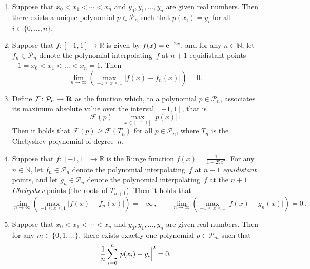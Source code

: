 \documentclass[a4paper]{article}
\begin{document}
\begin{enumerate}

    \item
        Suppose that $x_0 < x_1 < \dotsb < x_n$ and $y_0, y_1, \dotsc, y_n$ are given real numbers.
        Then there exists a unique polynomial $p \in \mathcal P_n$ such that $p(x_i) = y_i$ for all $i \in \{0, \dotsc, n\}$.

    \item
        Suppose that $f \colon [-1, 1] \to \mathbb R$ is given by $f(x) = \mathrm e^{-2x}$,
        and for any $n \in \mathbb N$,
        let $f_n \in \mathcal P_n$ denote the polynomial interpolating~$f$ at $n+1$ equidistant points $-1 = x_0 < x_1 < \dotsc < x_n = 1$.
        Then
        \[
            \lim_{n \to \infty} \left( \max_{-1 \leq x \leq 1} \bigl\lvert f(x) - f_n(x) \bigr\rvert \right) = 0.
        \]

    \item
        Define $\mathcal F \colon \mathcal P_n \to \mathbf R$ as the function which,
        to a polynomial $p \in \mathcal P_n$, associates its maximum absolute value over the interval $[-1, 1]$,
        that is
        \[
            \mathcal F(p) = \max_{x \in [-1, 1]} \left\lvert p(x) \right\rvert \, .
        \]
        Then it holds that $\mathcal F(p) \geq \mathcal F(T_n)$ for all $p \in \mathcal P_n$,
        where $T_n$ is the Chebyshev polynomial of degree~$n$.


    \item
        Suppose that $f \colon [-1, 1] \to \mathbb R$ is the Runge function $f(x) = \frac{1}{1 + 25 x^2}$.
        For any $n \in \mathbb N$,
        let $f_n \in \mathcal P_n$ denote the polynomial interpolating~$f$ at $n+1$ \emph{equidistant} points,
        and let $g_n \in \mathcal P_n$ denote the polynomial interpolating~$f$ at the $n+1$ \emph{Chebyshev} points (the roots of $T_{n+1}$).
        Then it holds that
        \[
            \lim_{n \to \infty} \left( \max_{-1 \leq x \leq 1} \bigl\lvert f(x) - f_n(x) \bigr\rvert \right) = +\infty \, ,
            \qquad
            \lim_{n \to \infty} \left( \max_{-1 \leq x \leq 1} \bigl\lvert f(x) - g_n(x) \bigr\rvert \right) = 0 \, .
        \]

    \item
        Suppose that $x_0 < x_1 < \dotsb < x_n$ and $y_0, y_1, \dotsc, y_n$ are given real numbers.
        Then for any $m \in \{0, 1, \dotsc\}$,
        there exists exactly one polynomial $p \in \mathcal P_m$ such that 
        \[
            \frac{1}{n} \sum_{i=0}^{n} \Bigl\lvert p(x_i) - y_i \Bigr\rvert^2 = 0.
        \]


\end{enumerate}
\end{document}
